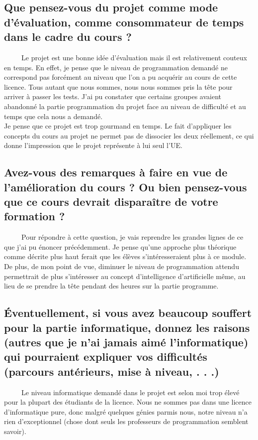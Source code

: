 \documentclass[a4paper,12pt]{report}
\begin{document}
\subsection*{Que pensez-vous du projet comme mode d’évaluation, comme consommateur de temps dans le cadre du cours ?}
\ \ \ \ \  Le projet est une bonne idée d'évaluation mais il est relativement couteux en temps. En effet, je pense que le niveau de programmation demandé ne correspond pas forcément au niveau que l'on a pu acquérir au cours de cette licence. Tous autant que nous sommes, nous nous sommes pris la tête pour arriver à passer les tests. J'ai pu constater que certains groupes avaient abandonné la partie programmation du projet face au niveau de difficulté et au temps que cela nous a demandé. \\
Je pense que ce projet est trop gourmand en temps. Le fait d'appliquer les concepts du cours au projet ne permet pas de dissocier les deux réellement, ce qui donne l'impression que le projet représente à lui seul l'UE.
\subsection*{Avez-vous des remarques à faire en vue de l’amélioration du cours ? Ou bien pensez-vous que ce cours devrait
disparaître de votre formation ?}
\ \ \ \ \ Pour répondre à cette question, je vais reprendre les grandes lignes de ce que j'ai pu énoncer précédemment. Je pense qu'une approche plus théorique comme décrite plus haut ferait que les élèves s'intéresseraient plus à ce module. De plus, de mon point de vue, diminuer le niveau de programmation attendu permettrait de plus s'intéresser au concept d'intelligence d'artificielle même, au lieu de se prendre la tête pendant des heures sur la partie programme. 

\subsection*{Éventuellement, si vous avez beaucoup souffert pour la partie informatique, donnez les raisons (autres que je
n’ai jamais aimé l’informatique) qui pourraient expliquer vos difficultés (parcours antérieurs, mise à niveau, . . .)}
\ \ \ \ \  Le niveau informatique demandé dans le projet est selon moi trop élevé pour la plupart des étudiants de la licence. Nous ne sommes pas dans une licence d'informatique pure, donc malgré quelques génies parmis nous, notre niveau n'a rien d'exceptionnel (chose dont seuls les professeurs de programmation semblent savoir).
\end{document}
